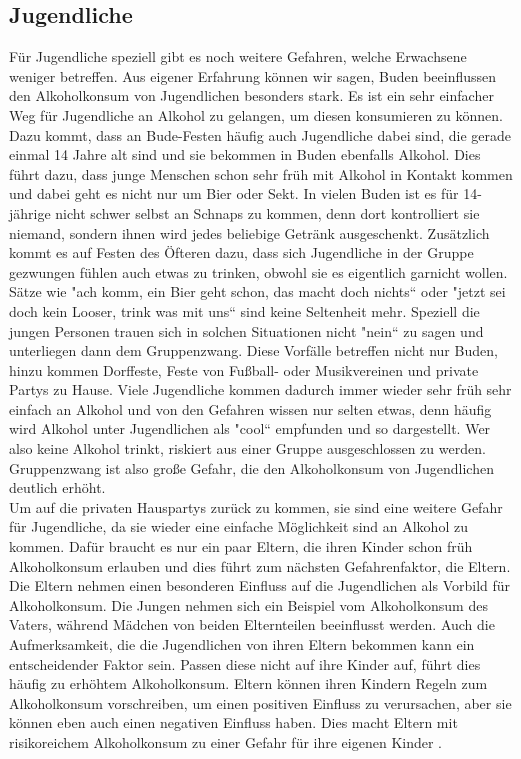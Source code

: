 \documentclass[12pt]{article}
\begin{document}
\subsection{Jugendliche}
Für Jugendliche speziell gibt es noch weitere Gefahren, welche Erwachsene weniger betreffen. Aus eigener Erfahrung können wir sagen, Buden beeinflussen den Alkoholkonsum von Jugendlichen besonders stark. Es ist ein sehr einfacher Weg für Jugendliche an Alkohol zu gelangen, um diesen konsumieren zu können. Dazu kommt, dass an Bude-Festen häufig auch Jugendliche dabei sind, die gerade einmal 14 Jahre alt sind und sie bekommen in Buden ebenfalls Alkohol. Dies führt dazu, dass junge Menschen schon sehr früh mit Alkohol in Kontakt kommen und dabei geht es nicht nur um Bier oder Sekt. In vielen Buden ist es für 14-jährige nicht schwer selbst an Schnaps zu kommen, denn dort kontrolliert sie niemand, sondern ihnen wird jedes beliebige Getränk ausgeschenkt. Zusätzlich kommt es auf Festen des Öfteren dazu, dass sich Jugendliche in der Gruppe gezwungen fühlen auch etwas zu trinken, obwohl sie es eigentlich garnicht wollen. Sätze wie "ach komm, ein Bier geht schon, das macht doch nichts“ oder "jetzt sei doch kein Looser, trink was mit uns“ sind keine Seltenheit mehr. Speziell die jungen Personen trauen sich in solchen Situationen nicht "nein“ zu sagen und unterliegen dann dem Gruppenzwang. Diese Vorfälle betreffen nicht nur Buden, hinzu kommen Dorffeste, Feste von Fußball- oder Musikvereinen und private Partys zu Hause. Viele Jugendliche kommen dadurch immer wieder sehr früh sehr einfach an Alkohol und von den Gefahren wissen nur selten etwas, denn häufig wird Alkohol unter Jugendlichen als "cool“ empfunden und so dargestellt. Wer also keine Alkohol trinkt, riskiert aus einer Gruppe ausgeschlossen zu werden. Gruppenzwang ist also große Gefahr, die den Alkoholkonsum von Jugendlichen deutlich erhöht.\\
Um auf die privaten Hauspartys zurück zu kommen, sie sind eine weitere Gefahr für Jugendliche, da sie wieder eine einfache Möglichkeit sind an Alkohol zu kommen. Dafür braucht es nur ein paar Eltern, die ihren Kinder schon früh Alkoholkonsum erlauben und dies führt zum nächsten Gefahrenfaktor, die Eltern. Die Eltern nehmen einen besonderen Einfluss auf die Jugendlichen als Vorbild für Alkoholkonsum. Die Jungen nehmen sich ein Beispiel vom Alkoholkonsum des Vaters, während Mädchen von beiden Elternteilen beeinflusst werden. Auch die Aufmerksamkeit, die die Jugendlichen von ihren Eltern bekommen kann ein entscheidender Faktor sein. Passen diese nicht auf ihre Kinder auf, führt dies häufig zu erhöhtem Alkoholkonsum. Eltern können ihren Kindern Regeln zum Alkoholkonsum vorschreiben, um einen positiven Einfluss zu verursachen, aber sie können eben auch einen negativen Einfluss haben. Dies macht Eltern mit risikoreichem Alkoholkonsum zu einer Gefahr für ihre eigenen Kinder \autocite[27]{kuhn_empfehlungen_nodate}. \\
\end{document}

